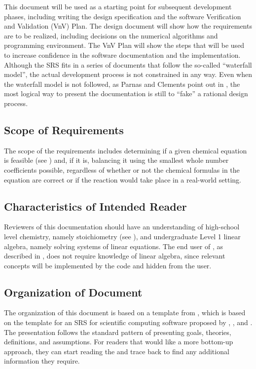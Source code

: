 \documentclass[12pt]{article}
\begin{document}
This document will be used as a starting point for subsequent development
phases, including writing the design specification and the software Verification
and Validation (VnV) Plan. The design document will show how the requirements
are to be realized, including decisions on the numerical algorithms and
programming environment. The VnV Plan will show the steps that will be used to
increase confidence in the software documentation and the implementation.
Although the SRS fits in a series of documents that follow the so-called
``waterfall model'', the actual development process is not constrained in any
way. Even when the waterfall model is not followed, as Parnas and Clements point
out in \cite{ParnasAndClements1986}, the most logical way to present the
documentation is still to ``fake'' a rational design process.

\subsection{Scope of Requirements} \label{sec_scope}

The scope of the requirements includes determining if a given chemical equation
is feasible (see ) and, if it is, balancing it using the
smallest whole number coefficients possible, regardless of whether or not the
chemical formulas in the equation are correct or if the reaction would take
place in a real-world setting.

\subsection{Characteristics of Intended Reader} \label{sec_IntendedReader}
Reviewers of this documentation should have an understanding of high-school level
chemistry, namely stoichiometry (see ), and undergraduate
Level 1 linear algebra, namely solving systems of linear equations. The end user
of \progname{}, as described in , does not require
knowledge of linear algebra, since relevant concepts will be implemented by the
code and hidden from the user.

\subsection{Organization of Document}
The organization of this document is based on a template from
\cite{smith_captemplate_2022}, which is based on the template for an SRS for
scientific computing software proposed by \cite{SmithAndLai2005},
\cite{SmithEtAl2007}, and \cite{koothoor_document_2013}. The presentation
follows the standard pattern of presenting goals, theories, definitions, and
assumptions. For readers that would like a more bottom-up approach, they can
start reading the  and trace back to find any additional
information they require.
\end{document}
